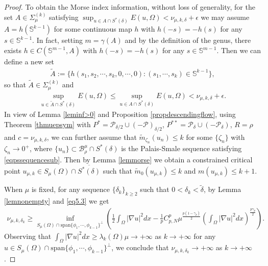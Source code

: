 \documentclass[10pt,a4paper]{article}
\theoremstyle{definition} \theoremstyle{remark}
\numberwithin{equation}{section}
\newcommand{\B}{\mathcal{B}}
\newcommand{\p}{\mathcal{P}}
\newcommand{\s}{\mathbb{S}}
\newcommand{\la}{\lambda}
\newcommand{\ga}{\gamma}
\newcommand{\ep}{\epsilon}
\begin{document}
\begin{proof}
    To obtain the Morse index information, without loss of generality, for the set $A \in \Sigma_{\mu}^{(k)}$ satisfying $\sup_{u \in A \cap S^*(\delta)}E(u,\Omega) < \nu_{\mu,k,\delta} + \ep$ we may assume $A = h(\s^{k-1})$ for some continuous map $h$ with $h(-s) = -h(s)$ for any $s \in \s^{k-1}$. In fact, setting $m = \ga(A)$ and by the definition of the genus, there exists $h \in C(\s^{m-1},A)$ with $h(-s) = -h(s)$ for any $s \in \s^{m-1}$. Then we can define a new set
    \begin{align*}
    	\tilde A := \bigl\{h(s_1,s_2,\cdots,s_k,0,\cdots,0): (s_1,\cdots,s_k) \in \s^{k-1}\bigr\},
    \end{align*}
    so that $\tilde A \in \Sigma_{\mu}^{(k)}$ and
    \begin{align*}
    	\sup_{u \in \tilde A \cap S^*(\delta)}E(u,\Omega) \leq \sup_{u \in A \cap S^*(\delta)}E(u,\Omega) < \nu_{\mu,k,\delta} + \ep.
    \end{align*}
    In view of Lemma \ref{leminf>0} and Proposition \ref{propdescendingflow}, using Theorem \ref{thmuepsym} with $P^* = \p_{\delta/2} \cup (-\p)_{\delta/2}$, $P^{**} = \p_\delta \cup (-\p_\delta)$, $R = \rho$ and $c = \nu_{\mu,k,\delta}$, we can further assume that $\tilde m_{\zeta_n} (u_n) \leq k$ for some $\{\zeta_n\}$ with $\zeta_n \to 0^+$, where $\{u_n\}\subset \B_{\rho}^\mu \cap S^*(\delta)$ is the Palais-Smale sequence satisfying \eqref{eqpssequencesub}. Then by Lemma \ref{lemmorse} we obtain a constrained critical point $u_{\mu,k} \in S_\mu(\Omega) \cap \overline{S^*(\delta)}$ such that $\tilde m_0(u_{\mu,k}) \leq k$ and $m(u_{\mu,k}) \leq k+1$.

    When $\mu$ is fixed, for any sequence $\{\delta_k\}_{k \ge 2}$ such that $0 < \delta_k < \tilde \delta$, by Lemma \ref{lemnonempty} and \eqref{eq5.3} we get
    \begin{align} \label{eq5.7}
    	\nu_{\mu,k,\delta_k} \geq \inf_{S_\mu(\Omega) \cap \text{span}\{\phi_1,\cdots,\phi_{k-1}\}^{\bot}}\left( \frac12 \int_\Omega |\nabla u|^2dx - \frac1p C_{p,N}^p \mu^{\frac{p(1-\ga_p)}{2}}\left( \int_\Omega |\nabla u|^2dx\right) ^{\frac{p\ga_p}{2}} \right).
    \end{align}
    Observing that $\int_\Omega |\nabla u|^2dx \ge \la_k(\Omega) \mu \to +\infty$ as $k \to +\infty$ for any $u \in S_\mu(\Omega) \cap \text{span}\{\phi_1,\cdots,\phi_{k-1}\}^{\bot}$, we conclude that $\nu_{\mu,k,\delta_k} \to +\infty$ as $k \to +\infty$.


\end{proof}
\end{document}
